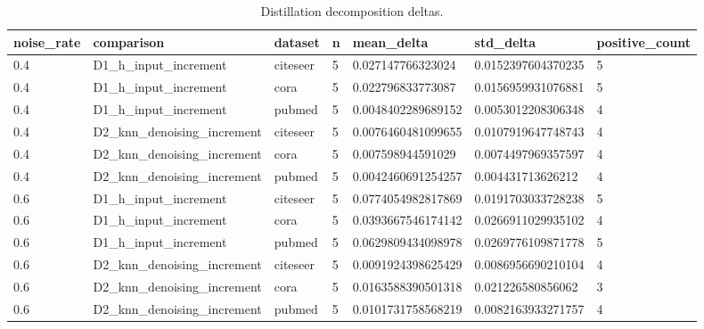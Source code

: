 \begin{table}[t]
\centering
\caption{Distillation decomposition deltas.}
\label{tab:distill-decomp}
\begin{tabular}{lllllll}
\toprule
noise_rate & comparison & dataset & n & mean_delta & std_delta & positive_count \\
\midrule
0.4 & D1_h_input_increment & citeseer & 5 & 0.027147766323024 & 0.0152397604370235 & 5 \\
0.4 & D1_h_input_increment & cora & 5 & 0.022796833773087 & 0.0156959931076881 & 5 \\
0.4 & D1_h_input_increment & pubmed & 5 & 0.0048402289689152 & 0.0053012208306348 & 4 \\
0.4 & D2_knn_denoising_increment & citeseer & 5 & 0.0076460481099655 & 0.0107919647748743 & 4 \\
0.4 & D2_knn_denoising_increment & cora & 5 & 0.007598944591029 & 0.0074497969357597 & 4 \\
0.4 & D2_knn_denoising_increment & pubmed & 5 & 0.0042460691254257 & 0.004431713626212 & 4 \\
0.6 & D1_h_input_increment & citeseer & 5 & 0.0774054982817869 & 0.0191703033728238 & 5 \\
0.6 & D1_h_input_increment & cora & 5 & 0.0393667546174142 & 0.0266911029935102 & 4 \\
0.6 & D1_h_input_increment & pubmed & 5 & 0.0629809434098978 & 0.0269776109871778 & 5 \\
0.6 & D2_knn_denoising_increment & citeseer & 5 & 0.0091924398625429 & 0.0086956690210104 & 4 \\
0.6 & D2_knn_denoising_increment & cora & 5 & 0.0163588390501318 & 0.021226580856062 & 3 \\
0.6 & D2_knn_denoising_increment & pubmed & 5 & 0.0101731758568219 & 0.0082163933271757 & 4 \\
\bottomrule
\end{tabular}
\end{table}
